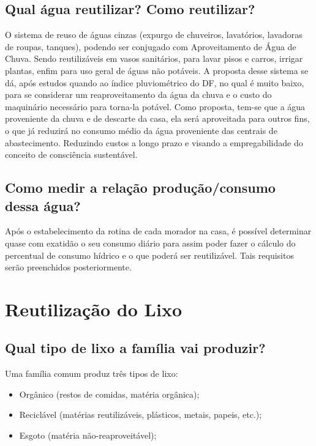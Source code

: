 \subsection{Qual água reutilizar? Como reutilizar?}

	O sistema de reuso de águas cinzas (expurgo de chuveiros, lavatórios, lavadoras de roupas, tanques), podendo ser conjugado com Aproveitamento de Água de Chuva. Sendo reutilizáveis em vasos sanitários, para lavar pisos e carros, irrigar plantas, enfim para uso geral de águas não potáveis. A proposta desse sistema se dá, após estudos quando ao índice pluviométrico do DF, no qual é muito baixo, para se considerar um reaproveitamento da água da chuva e o custo do maquinário necessário para torna-la potável. Como proposta, tem-se que a água proveniente da chuva e de descarte da casa, ela será aproveitada para outros fins, o que já reduzirá no consumo médio da água proveniente das centrais de abastecimento. Reduzindo custos a longo prazo e visando a empregabilidade do conceito de consciência sustentável.

\subsection{Como medir a relação produção/consumo dessa água?}

	Após o estabelecimento da rotina de cada morador na casa, é possível determinar quase com exatidão o seu consumo diário para assim poder fazer o cálculo do percentual de consumo hídrico e o que poderá ser reutilizável. Tais requisitos serão preenchidos posteriormente.

\section{Reutilização do Lixo}
\subsection{Qual tipo de lixo a família vai produzir?}

Uma família comum produz três tipos de lixo:
\begin{itemize}
	\item Orgânico (restos de comidas, matéria orgânica);
	\item Reciclável (matérias reutilizáveis, plásticos, metais, papeis, etc.);
	\item Esgoto (matéria não-reaproveitável);
\end{itemize}

